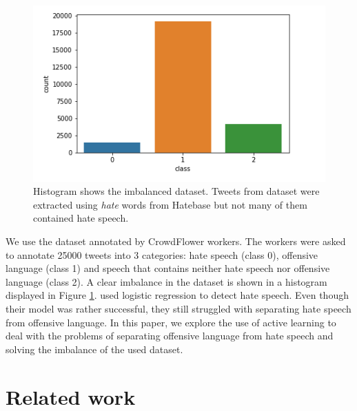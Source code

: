 \documentclass[10pt, a4paper]{article}
\begin{document}
	\begin{figure}[h]
		\includegraphics[width=1.1\linewidth, height=0.25\textheight]{pictures/HistOfData}
		\caption[Histogram showing number of labeled classes]{Histogram shows the imbalanced dataset. Tweets from dataset were extracted using \textit{hate} words from Hatebase but not many of them contained hate speech.}
		\label{fig:histofdata}
	\end{figure}
	
	We use the dataset annotated by CrowdFlower workers. The workers were asked to annotate 25000 tweets into 3 categories: hate speech (class 0), offensive language (class 1) and speech that contains neither hate speech nor offensive language (class 2). A clear imbalance in the dataset is shown in a histogram displayed in Figure \ref{fig:histofdata}. \citet{Davidson2017AutomatedHS} used logistic regression to detect hate speech. Even though their model was rather successful, they still struggled with separating hate speech from offensive language. In this paper, we explore the use of active learning to deal with the problems of separating offensive language from hate speech and solving the imbalance of the used dataset.
	
	
	\section{Related work}
	
\end{document}
